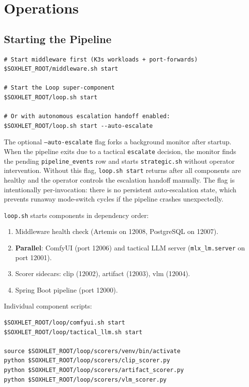 \documentclass[11pt,letterpaper]{article}
\begin{document}
\section{Operations}

\subsection{Starting the Pipeline}

\begin{lstlisting}[style=shell]
# Start middleware first (K3s workloads + port-forwards)
$SOXHLET_ROOT/middleware.sh start

# Start the Loop super-component
$SOXHLET_ROOT/loop.sh start

# Or with autonomous escalation handoff enabled:
$SOXHLET_ROOT/loop.sh start --auto-escalate
\end{lstlisting}

The optional \texttt{--auto-escalate} flag forks a background monitor after
startup. When the pipeline exits due to a tactical \texttt{escalate} decision,
the monitor finds the pending \texttt{pipeline\_events} row and starts
\texttt{strategic.sh} without operator intervention. Without this flag,
\texttt{loop.sh start} returns after all components are healthy and the
operator controls the escalation handoff manually. The flag is intentionally
per-invocation: there is no persistent auto-escalation state, which prevents
runaway mode-switch cycles if the pipeline crashes unexpectedly.

\texttt{loop.sh} starts components in dependency order:

\begin{enumerate}
  \item Middleware health check (Artemis on 12008, PostgreSQL on 12007).
  \item \textbf{Parallel}: ComfyUI (port 12006) and tactical LLM server
        (\texttt{mlx\_lm.server} on port 12001).
  \item Scorer sidecars: clip (12002), artifact (12003), vlm (12004).
  \item Spring Boot pipeline (port 12000).
\end{enumerate}

Individual component scripts:

\begin{lstlisting}[style=shell]
$SOXHLET_ROOT/loop/comfyui.sh start
$SOXHLET_ROOT/loop/tactical_llm.sh start

source $SOXHLET_ROOT/loop/scorers/venv/bin/activate
python $SOXHLET_ROOT/loop/scorers/clip_scorer.py
python $SOXHLET_ROOT/loop/scorers/artifact_scorer.py
python $SOXHLET_ROOT/loop/scorers/vlm_scorer.py
\end{lstlisting}
\end{document}

